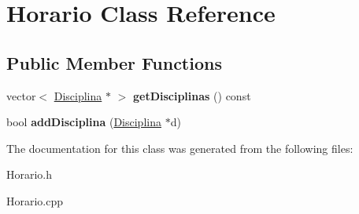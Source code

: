 \hypertarget{class_horario}{\section{Horario Class Reference}
\label{class_horario}
}
\subsection*{Public Member Functions}
\begin{DoxyCompactItemize}
\item 
\hypertarget{class_horario_a0eceba486c1179a4254f756cd2867667}{vector$<$ \hyperlink{class_disciplina}{Disciplina} $\ast$ $>$ {\bfseries get\-Disciplinas} () const }\label{class_horario_a0eceba486c1179a4254f756cd2867667}

\item 
\hypertarget{class_horario_ac2105346d7fcdbc59b0c7baa5082934d}{bool {\bfseries add\-Disciplina} (\hyperlink{class_disciplina}{Disciplina} $\ast$d)}\label{class_horario_ac2105346d7fcdbc59b0c7baa5082934d}

\end{DoxyCompactItemize}


The documentation for this class was generated from the following files\-:\begin{DoxyCompactItemize}
\item 
Horario.\-h\item 
Horario.\-cpp\end{DoxyCompactItemize}
